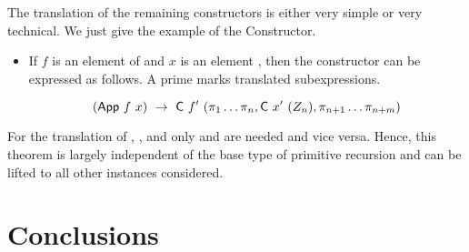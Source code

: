 \documentclass{jfp}
\begin{document}
The translation of the remaining constructors is either very simple or very technical. We just give the example of the  Constructor.
\begin{itemize}
\item If $f$ is an element of  and $x$ is
  an element , then the
   constructor can be expressed as
  follows. A prime marks translated subexpressions.
	
	$$ (\AgdaInductiveConstructor{App} \ f \ x) \ \rightarrow \ \AgdaInductiveConstructor{C} \ f' \ (\pi_{1}\dots\pi_{n}, \AgdaInductiveConstructor{C} \ x' \ (Z_{n}),\pi_{n + 1}\dots\pi_{n + m}  ) $$ 
\end{itemize}

For the translation of ,
, and  only
 and  are
needed and vice versa. Hence, this theorem is largely independent
of the base type of primitive recursion and can be lifted to all other
instances considered.



%




\section{Conclusions}
\label{sec:conclusions}




\label{lastpage01}
\end{document}
